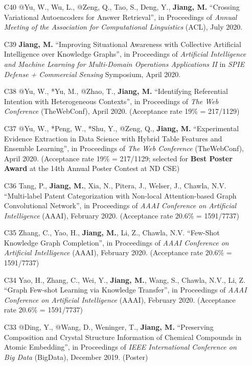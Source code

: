 \documentclass[10pt]{article}
\newenvironment{myindentpar}[1]%
{\begin{list}{}%
         {\setlength{\leftmargin}{#1}}%
         \item[]%
}
{\end{list}}
\newcounter{list}
\begin{document}
\begin{myindentpar}{0.00cm}
\begin{enumerate}[leftmargin=.5cm]
\item[C40] @Yu, W., Wu, L., @Zeng, Q., Tao, S., Deng, Y., \textbf{Jiang, M.} ``Crossing Variational Autoencoders for Answer Retrieval'', in Proceedings of \textit{Annual Meeting of the Association for Computational Linguistics} (ACL), July 2020.

\item[C39] \textbf{Jiang, M.} ``Improving Situational Awareness with Collective Artificial Intelligence over Knowledge Graphs'', in Proceedings of \textit{Artificial Intelligence and Machine Learning for Multi-Domain Operations Applications II} in \textit{SPIE Defense + Commercial Sensing} Symposium, April 2020.

\item[C38] @Yu, W., *Yu, M., @Zhao, T., \textbf{Jiang, M.} ``Identifying Referential Intention with Heterogeneous Contexts'', in Proceedings of \textit{The Web Conference} (TheWebConf), April 2020. (Acceptance rate 19\% = 217/1129)

\item[C37] @Yu, W., *Peng, W., *Shu, Y., @Zeng, Q., \textbf{Jiang, M.} ``Experimental Evidence Extraction in Data Science with Hybrid Table Features and Ensemble Learning'', in Proceedings of \textit{The Web Conference} (TheWebConf), April 2020. (Acceptance rate 19\% = 217/1129; selected for \textbf{Best Poster Award} at the 14th Annual Poster Contest at ND CSE)

\item[C36] Tang, P., \textbf{Jiang, M.}, Xia, N., Pitera, J., Welser, J., Chawla, N.V. ``Multi-label Patent Categorization with Non-local Attention-based Graph Convolutional Network'', in Proceedings of \textit{AAAI Conference on Artificial Intelligence} (AAAI), February 2020. (Acceptance rate 20.6\% = 1591/7737)
	
\item[C35] Zhang, C., Yao, H., \textbf{Jiang, M.}, Li, Z., Chawla, N.V. ``Few-Shot Knowledge Graph Completion'', in Proceedings of \textit{AAAI Conference on Artificial Intelligence} (AAAI), February 2020. (Acceptance rate 20.6\% = 1591/7737)

\item[C34] Yao, H., Zhang, C., Wei, Y., \textbf{Jiang, M.}, Wang, S., Chawla, N.V., Li, Z. ``Graph Few-shot Learning via Knowledge Transfer'', in Proceedings of \textit{AAAI Conference on Artificial Intelligence} (AAAI), February 2020. (Acceptance rate 20.6\% = 1591/7737)

\item[C33] @Ding, Y., @Wang, D., Weninger, T., \textbf{Jiang, M.} ``Preserving Composition and Crystal Structure Information of Chemical Compounds in Atomic Embedding'', in Proceedings of \textit{IEEE International Conference on Big Data} (BigData), December 2019. (Poster)


\end{enumerate}
\end{myindentpar}
\end{document}
